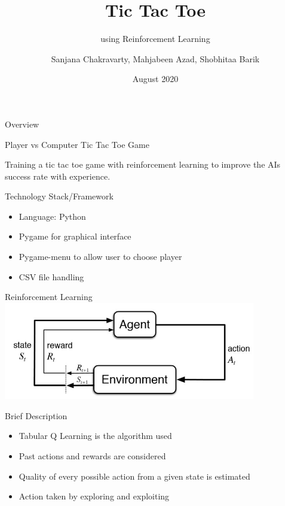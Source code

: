\documentclass[14pt]{beamer}
\title[WTEF 2020]{Tic Tac Toe}
\subtitle{using Reinforcement Learning}
\author[Group 12]{Sanjana Chakravarty, Mahjabeen Azad, Shobhitaa Barik}
\date{August 2020}
\begin{document}
\begin{frame}
    \titlepage
\end{frame}

\begin{frame}{Overview}
    \begin{center}
        \textcolor{myAmber}{Player vs Computer Tic Tac Toe Game}
    \end{center}
   
    \begin{center}
    Training a tic tac toe game with reinforcement learning to improve the AI\textquotesingle s success rate with experience.
    \end{center}
\end{frame}

\begin{frame}{Technology Stack/Framework}
        \begin{itemize}
            \item Language: Python
            \item Pygame for graphical interface 
            \item Pygame-menu to allow user to choose player
            \item CSV file handling
        \end{itemize}
\end{frame}

\begin{frame}{Reinforcement Learning}
    \includegraphics[width=110mm]{RL.jpg}
\end{frame}

\begin{frame}{Brief Description}
        \begin{itemize}
            \item Tabular Q Learning is the algorithm used
            \item Past actions and rewards are considered
            \item Quality of every possible action from a given state is estimated
            \item Action taken by exploring and exploiting
        \end{itemize}
\end{frame}
\end{document}
